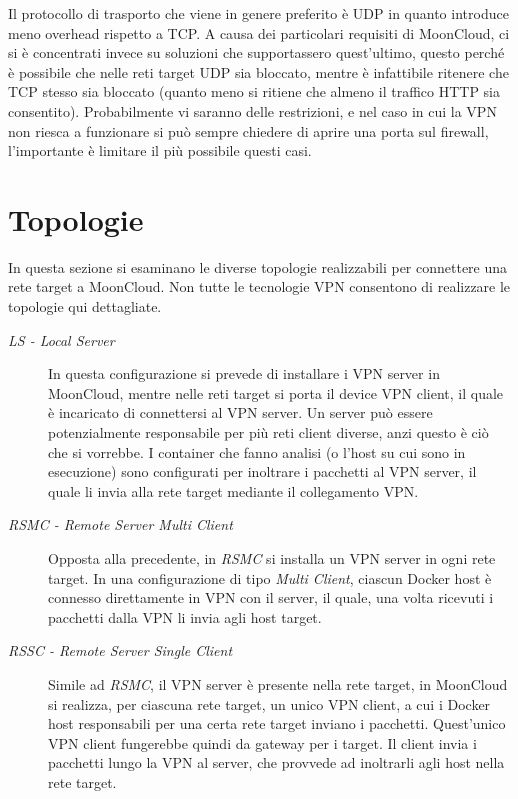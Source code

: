 Il protocollo di trasporto che viene in genere preferito è UDP in quanto introduce meno
overhead rispetto a TCP. A causa
dei particolari requisiti di MoonCloud, ci si è concentrati invece su soluzioni che
supportassero quest'ultimo, questo perché è possibile che nelle reti target UDP sia bloccato,
mentre è infattibile ritenere che TCP stesso sia bloccato (quanto meno si ritiene
che almeno il traffico HTTP sia consentito). Probabilmente vi saranno
delle restrizioni, e nel caso in cui la VPN non riesca a funzionare si può sempre
chiedere di aprire una porta sul firewall, l'importante è limitare il più possibile
questi casi.


\section{Topologie}
In questa sezione si esaminano le diverse topologie realizzabili per connettere una rete
target a MoonCloud. Non tutte le tecnologie VPN consentono di realizzare le topologie qui
dettagliate.
\begin{description}
	\item[\textit{LS - Local Server}]In questa configurazione si prevede di installare i
	VPN server in MoonCloud, mentre nelle reti target si porta il device
	VPN client, il quale è incaricato di connettersi al VPN server. Un server può essere
	potenzialmente responsabile per più reti client diverse, anzi questo
	è ciò che si vorrebbe. I container che fanno analisi
	(o l'host su cui sono in esecuzione)
	sono configurati per inoltrare i pacchetti al VPN server, il quale li invia alla rete
	target mediante il collegamento VPN.
	\item[\textit{RSMC - Remote Server Multi Client}]Opposta alla precedente, in \textit{RSMC}
	si installa un VPN server in ogni rete target. In una configurazione di tipo
	\textit{Multi Client}, ciascun Docker host è connesso direttamente in VPN con il server, il
	quale, una volta ricevuti i pacchetti dalla VPN li invia agli host target.
	\item[\textit{RSSC - Remote Server Single Client}]Simile ad \textit{RSMC}, il VPN
	server è presente nella rete target, in MoonCloud si realizza, per ciascuna rete
	target, un unico VPN client, a cui i Docker host responsabili per una certa rete target inviano
  i pacchetti. Quest'unico VPN client fungerebbe quindi da gateway per i target.
  Il client invia i pacchetti lungo la VPN al server,
	che provvede ad inoltrarli agli host nella rete target.
\end{description}
